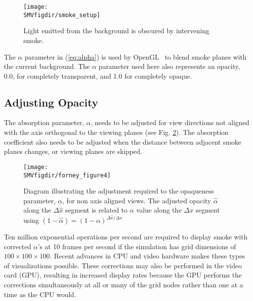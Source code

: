 {\begin{figure}[bph]
\begin{center}
\texttt{[image: \\SMVfigdir/smoke\_setup]}
\end{center}
\caption[Light emitted from the background is obscured by intervening smoke.]
{Light emitted from the background is obscured by intervening smoke.
}
\label{figsmokesetup}
\end{figure}

The $\alpha$ parameter in (\ref{eq:alpha}) is used by
OpenGL~\cite{OpenGLRed} to blend smoke planes with the current
background.  The $\alpha$ parameter used here also represents an
opacity, 0.0, for completely transparent, and 1.0 for completely
opaque.


\subsection{Adjusting Opacity}

The absorption parameter, $\alpha$, needs to be adjusted for view
directions not aligned with the axis orthogonal to the viewing
planes (see Fig. \ref{figray}).  The absorption coefficient also
needs to be adjusted when the distance between adjacent smoke
planes changes, or viewing planes are skipped.

\begin{figure}[bph]
\centerline{\texttt{[image: \\SMVfigdir/forney\_figure4]}}
\caption [Diagram illustrating the adjustment required to the
opaqueness parameter, $\alpha$, for non-axis aligned views.] {
Diagram illustrating the adjustment required to the opaqueness
parameter, $\alpha$, for non axis aligned views. The adjusted
opacity $\hat{\alpha}$ along the $\Delta\hat{x}$ segment is
related to $\alpha$ value along the $\Delta x$ segment using
$(1-\hat{\alpha})=(1-\alpha)^{\Delta \hat{x}/\Delta x}$}
\label{figray}
\end{figure}

Ten million exponential operations per second are required to
display smoke with corrected $\alpha$'s at 10 frames per second if
the simulation has grid dimensions of $100\times 100\times 100$.
Recent advances in CPU and video hardware makes these types of
visualizations possible. These corrections may also be performed
in the video card (GPU), resulting in increased display rates
because the GPU performs the corrections simultaneously at all or
many of the grid nodes rather than one at a time as the CPU would.

}
